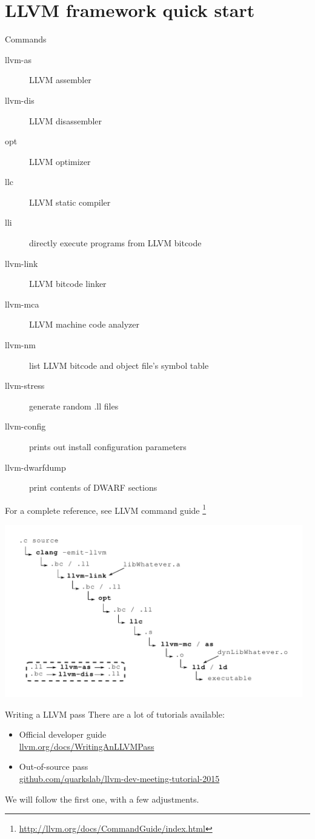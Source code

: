 \documentclass[10pt,mathserif]{beamer}
\begin{document}
\section{LLVM framework quick start}
\begin{frame}{Commands}
	\begin{description}
		\item[llvm-as] LLVM assembler
		\item[llvm-dis] LLVM disassembler
		\item[opt] LLVM optimizer
		\item[llc] LLVM static compiler
		\item[lli] directly execute programs from LLVM bitcode
		\item[llvm-link] LLVM bitcode linker
		\item[llvm-mca] LLVM machine code analyzer
		\item[llvm-nm] list LLVM bitcode and object file's symbol table
		\item[llvm-stress] generate random .ll files
		\item[llvm-config] prints out install configuration parameters
		\item[llvm-dwarfdump] print contents of DWARF sections
	\end{description}
	\vfill
	For a complete reference, see LLVM command guide \footnote{\url{http://llvm.org/docs/CommandGuide/index.html}}
\end{frame}

\begin{frame}
	\noindent\hspace{-1.2cm}\includegraphics[width=13cm]{img/03/toolchain}
\end{frame}

\begin{frame}{Writing a LLVM pass}
	There are a lot of tutorials available:
	\vfill
	\begin{itemize}
		\item Official developer guide\\ \href{http://llvm.org/docs/WritingAnLLVMPass.html}{\url{llvm.org/docs/WritingAnLLVMPass}}
		\vfill
		\item Out-of-source pass\\ \href{https://github.com/quarkslab/llvm-dev-meeting-tutorial-2015}{\url{github.com/quarkslab/llvm-dev-meeting-tutorial-2015}}
	\end{itemize}
	\vfill
	We will follow the first one, with a few adjustments.
\end{frame}
\end{document}
